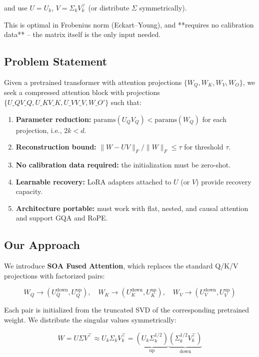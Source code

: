and use $U = U_k$, $V = \Sigma_k V_k^\top$ (or distribute $\Sigma$ symmetrically).

This is optimal in Frobenius norm (Eckart--Young), and **requires no calibration 
data** -- the matrix itself is the only input needed.

\subsection{Problem Statement}

Given a pretrained transformer with attention projections $\{W_Q, W_K, W_V, W_O\}$, 
we seek a compressed attention block with projections $\{U\_Q V\_Q, U\_K V\_K, U\_V V\_V, 
W\_O'\}$ such that:

\begin{enumerate}
\item \textbf{Parameter reduction:} $\text{params}(U_Q V_Q) < \text{params}(W_Q)$ for
  each projection, i.e., $2k < d$.
\item \textbf{Reconstruction bound:} $\|W - UV\|_F / \|W\|_F \leq \tau$ for
  threshold $\tau$.
\item \textbf{No calibration data required:} the initialization must be zero-shot.
\item \textbf{Learnable recovery:} LoRA adapters attached to $U$ (or $V$) provide
  recovery capacity.
\item \textbf{Architecture portable:} must work with flat, nested, and causal attention
  and support GQA and RoPE.

\end{enumerate}
\subsection{Our Approach}

We introduce \textbf{SOA Fused Attention}, which replaces the standard Q/K/V 
projections with factorized pairs:

\[
W_Q \to (U_Q^{\text{down}}, U_Q^{\text{up}}), \quad
W_K \to (U_K^{\text{down}}, U_K^{\text{up}}), \quad
W_V \to (U_V^{\text{down}}, U_V^{\text{up}})
\]

Each pair is initialized from the truncated SVD of the corresponding 
pretrained weight. We distribute the singular values symmetrically:

\[
W = U \Sigma V^\top \approx U_k \Sigma_k V_k^\top
= \underbrace{(U_k \Sigma_k^{1/2})}_{\text{up}} 
  \underbrace{(\Sigma_k^{1/2} V_k^\top)}_{\text{down}}
\]

